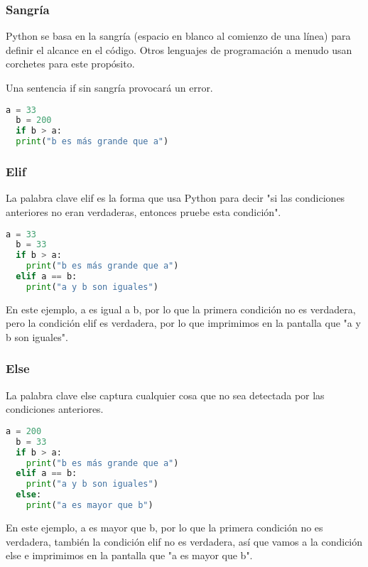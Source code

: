 \begin{frame}[fragile]
  \frametitle{Sangría}

  Python se basa en la sangría (espacio en blanco al comienzo de una línea)
  para definir el alcance en el código. Otros lenguajes de programación a
  menudo usan corchetes para este propósito.

  \pausa
  \vspace{\baselineskip}
  \begin{alertblock}{}
    Una sentencia if sin sangría provocará un error.
  \end{alertblock}

  \vspace{\baselineskip}
  \begin{lstlisting}[language=Python]
  a = 33
  b = 200
  if b > a:
  print("b es más grande que a")
  \end{lstlisting}
\end{frame}

\begin{frame}[fragile]
  \frametitle{Elif}

  La palabra clave \textcolor{codeKeyword}{elif} es la forma que usa Python
  para decir "si las condiciones anteriores no eran verdaderas, entonces
  pruebe esta condición".

  \vspace{\baselineskip}
  \begin{lstlisting}[language=Python]
  a = 33
  b = 33
  if b > a:
    print("b es más grande que a")
  elif a == b:
    print("a y b son iguales")
  \end{lstlisting}

  En este ejemplo, a es igual a b, por lo que la primera condición no es
  verdadera, pero la condición elif es verdadera, por lo que imprimimos en
  la pantalla que "a y b son iguales".
\end{frame}

\begin{frame}[fragile]
  \frametitle{Else}

  La palabra clave \textcolor{codeKeyword}{else} captura cualquier cosa que
  no sea detectada por las condiciones anteriores.

  \vspace{\baselineskip}
  \begin{lstlisting}[language=Python]
  a = 200
  b = 33
  if b > a:
    print("b es más grande que a")
  elif a == b:
    print("a y b son iguales")
  else:
    print("a es mayor que b")
  \end{lstlisting}

  En este ejemplo, a es mayor que b, por lo que la primera condición no es
  verdadera, también la condición elif no es verdadera, así que vamos a la
  condición else e imprimimos en la pantalla que "a es mayor que b". 
\end{frame}

